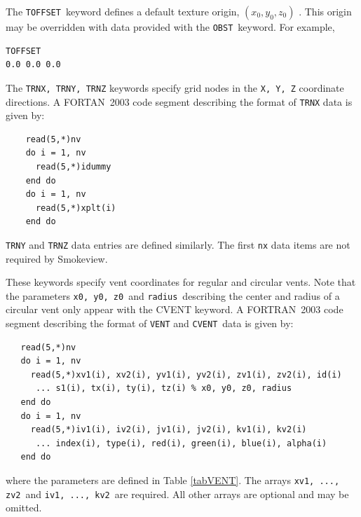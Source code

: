 \documentclass[11pt,twoside]{book}
\newcommand{\hitem}[1]{\item[{\bf #1} \hfill]}
\begin{document}
\hitem{TOFFSET}The {\tt TOFFSET}\ keyword defines a default texture origin, $(x_0, y_0, z_0)$ .
This origin may be overridden with data provided with the {\tt OBST}\ keyword. For example,

\begin{lstlisting}
TOFFSET
0.0 0.0 0.0
\end{lstlisting}

\hitem{TRNX,TRNY,TRNZ}The {\tt TRNX, TRNY, TRNZ} keywords specify
grid nodes in the {\tt X, Y, Z} coordinate directions.  A
FORTAN~2003 code segment describing the format of {\tt TRNX} data
is given by:
\begin{lstlisting}
    read(5,*)nv
    do i = 1, nv
      read(5,*)idummy
    end do
    do i = 1, nv
      read(5,*)xplt(i)
    end do
\end{lstlisting}
{\tt TRNY} and {\tt TRNZ} data entries are defined similarly. The
first {\tt nx} data items are not required by Smokeview.

\hitem{VENT, CVENT}These keywords specify vent coordinates for regular and circular vents.
Note that the parameters {\tt x0, y0, z0}\ and {\tt radius}\ describing the center and radius
of a circular vent
only appear with the CVENT keyword.
A FORTRAN~2003
code segment describing the format of {\tt VENT} and {\tt CVENT}\ data is given by:
\begin{lstlisting}
   read(5,*)nv
   do i = 1, nv
     read(5,*)xv1(i), xv2(i), yv1(i), yv2(i), zv1(i), zv2(i), id(i)
      ... s1(i), tx(i), ty(i), tz(i) % x0, y0, z0, radius
   end do
   do i = 1, nv
     read(5,*)iv1(i), iv2(i), jv1(i), jv2(i), kv1(i), kv2(i)
      ... index(i), type(i), red(i), green(i), blue(i), alpha(i)
   end do
\end{lstlisting}
where the parameters are defined in Table \ref{tabVENT}.  The arrays {\tt xv1,  ..., zv2}\ and {\tt iv1, ..., kv2}\ are
required. All other arrays are optional and may be omitted.
\end{document}
